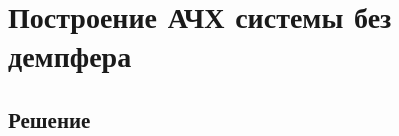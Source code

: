 \documentclass[11pt]{article}
\begin{document}
    \hypertarget{ux43fux43eux441ux442ux440ux43eux435ux43dux438ux435-ux430ux447ux445-ux441ux438ux441ux442ux435ux43cux44b-ux431ux435ux437-ux434ux435ux43cux43fux444ux435ux440ux430}{%
\section{Построение АЧХ системы без
демпфера}\label{ux43fux43eux441ux442ux440ux43eux435ux43dux438ux435-ux430ux447ux445-ux441ux438ux441ux442ux435ux43cux44b-ux431ux435ux437-ux434ux435ux43cux43fux444ux435ux440ux430}}

    \hypertarget{ux440ux435ux448ux435ux43dux438ux435}{%
\subsection{Решение}\label{ux440ux435ux448ux435ux43dux438ux435}}
\end{document}
